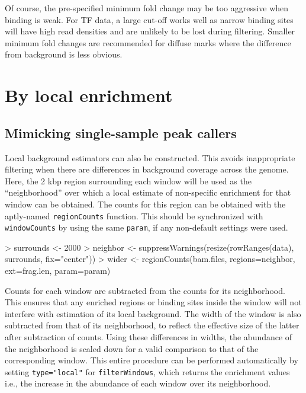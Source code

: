 \documentclass[12pt]{report}
\renewenvironment{Schunk}{\vspace{0pt}}{\vspace{0pt}}
\newcommand{\code}[1]{{\small\texttt{#1}}}
\begin{document}
Of course, the pre-specified minimum fold change may be too aggressive when binding is weak. 
For TF data, a large cut-off works well as narrow binding sites will have high read densities and are unlikely to be lost during filtering. 
Smaller minimum fold changes are recommended for diffuse marks where the difference from background is less obvious. 

\section{By local enrichment}

\subsection{Mimicking single-sample peak callers}
Local background estimators can also be constructed.
This avoids inappropriate filtering when there are differences in background coverage across the genome. 
Here, the 2 kbp region surrounding each window will be used as the ``neighborhood'' over which a local estimate of non-specific enrichment for that window can be obtained. 
The counts for this region can be obtained with the aptly-named \code{regionCounts} function.
This should be synchronized with \code{windowCounts} by using the same \code{param}, if any non-default settings were used.

\begin{Schunk}
\begin{Sinput}
> surrounds <- 2000
> neighbor <- suppressWarnings(resize(rowRanges(data), surrounds, fix="center"))
> wider <- regionCounts(bam.files, regions=neighbor, ext=frag.len, param=param)
\end{Sinput}
\end{Schunk}

Counts for each window are subtracted from the counts for its neighborhood.
This ensures that any enriched regions or binding sites inside the window will not interfere with estimation of its local background.
The width of the window is also subtracted from that of its neighborhood, to reflect the effective size of the latter after subtraction of counts.
Using these differences in widths, the abundance of the neighborhood is scaled down for a valid comparison to that of the corresponding window.
This entire procedure can be performed automatically by setting \code{type="local"} for \code{filterWindows}, which returns the enrichment values i.e., the increase in the abundance of each window over its neighborhood.
\end{document}
